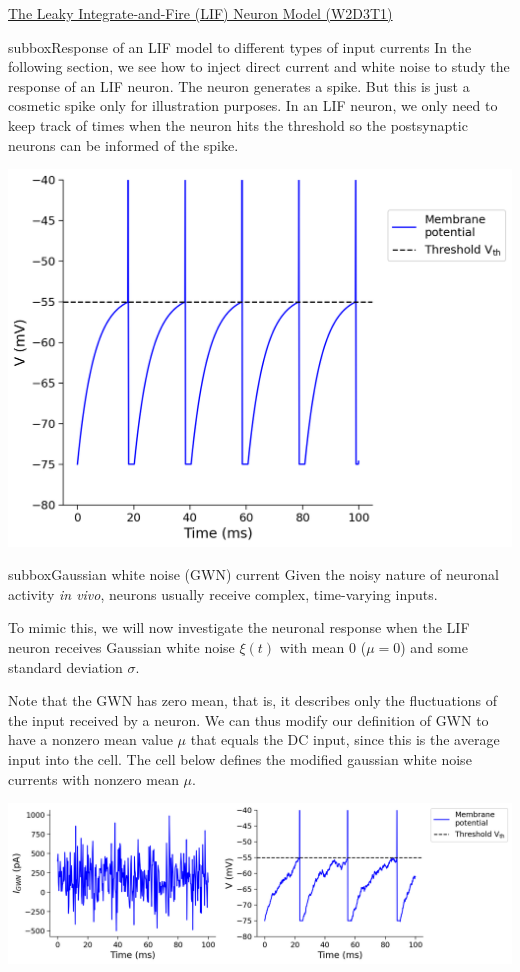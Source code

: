 \begin{textbox}{\href{https://compneuro.neuromatch.io/tutorials/W1D4_GeneralizedLinearModels/student/W1D4_Tutorial1.html}{The Leaky Integrate-and-Fire (LIF) Neuron Model (W2D3T1)} }
\begin{subbox}{subbox}{Response of an LIF model to different types of input currents}
\scriptsize
In the following section, we see how to inject direct current and white noise to study the response of an LIF neuron.
The neuron generates a spike. But this is just a cosmetic spike only for illustration purposes. In an LIF neuron, we only need to keep track of times when the neuron hits the threshold so the postsynaptic neurons can be informed of the spike. 

\centering
\includegraphics[scale=0.2]{Figures/BNM/LIF_Figure2.png}
\end{subbox}

\begin{subbox}{subbox}{Gaussian white noise (GWN) current 
}
\scriptsize
Given the noisy nature of neuronal activity \textit{in vivo}, neurons usually receive complex, time-varying inputs.

To mimic this, we will now investigate the neuronal response when the LIF neuron receives Gaussian white noise $\xi(t)$ with mean 0 ($\mu = 0$) and some standard deviation $\sigma$.

Note that the GWN has zero mean, that is, it describes only the fluctuations of the input received by a neuron. We can thus modify our definition of GWN to have a nonzero mean value $\mu$ that equals the DC input, since this is the average input into the cell. The cell below defines the modified gaussian white noise currents with nonzero mean $\mu$.

\centering
\includegraphics[scale=0.22]{Figures/BNM/LIF_Figure3.png}
\end{subbox}
\end{textbox}

